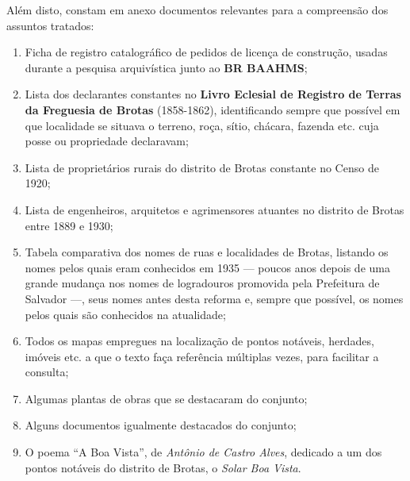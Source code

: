 Além disto, constam em anexo documentos relevantes para a compreensão dos assuntos tratados:

\begin{enumerate}
\item {}Ficha de registro catalográfico de pedidos de licença de construção, usadas durante a pesquisa arquivística junto ao \textbf{BR BAAHMS};
\item Lista dos declarantes constantes no \textbf{Livro Eclesial de Registro de Terras da Freguesia de Brotas} (1858-1862), identificando sempre que possível em que localidade se situava o terreno, roça, sítio, chácara, fazenda etc. cuja posse ou propriedade declaravam;
\item Lista de proprietários rurais do distrito de Brotas constante no Censo de 1920;
\item Lista de engenheiros, arquitetos e agrimensores atuantes no distrito de Brotas entre 1889 e 1930;
\item Tabela comparativa dos nomes de ruas e localidades de Brotas, listando os nomes pelos quais eram conhecidos em 1935 --- poucos anos depois de uma grande mudança nos nomes de logradouros promovida pela Prefeitura de Salvador \cite{souza_guia_1935} ---, seus nomes antes desta reforma e, sempre que possível, os nomes pelos quais são conhecidos na atualidade;
\item Todos os mapas empregues na localização de pontos notáveis, herdades, imóveis etc. a que o texto faça referência múltiplas vezes, para facilitar a consulta;
\item Algumas plantas de obras que se destacaram do conjunto;
\item Alguns documentos igualmente destacados do conjunto;
\item O poema ``A Boa Vista'', de \textit{Antônio de Castro Alves}, dedicado a um dos pontos notáveis do distrito de Brotas, o \textit{Solar Boa Vista}.
\end{enumerate}

